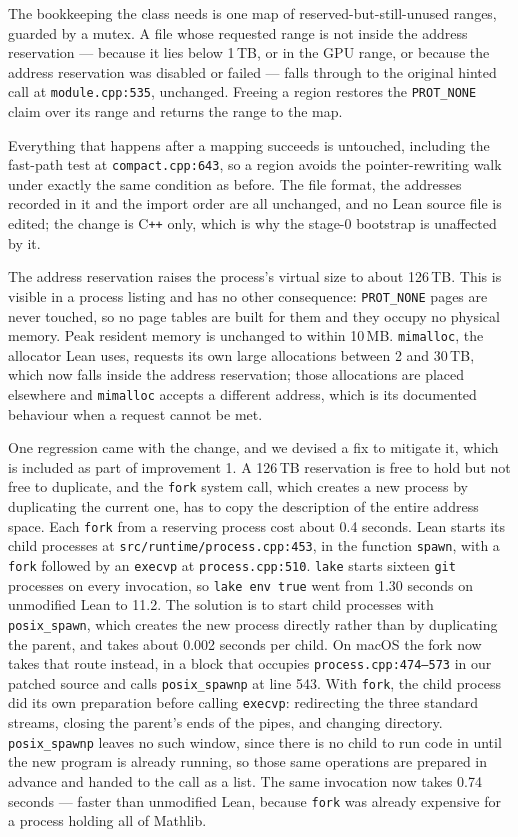 \documentclass{article}
\newcommand{\Lean}{Lean\xspace}      %
\newcommand{\lake}{\texttt{lake}\xspace}      %
\newcommand{\mathlib}{Mathlib\xspace}
\begin{document}
The bookkeeping the class needs is one map of reserved-but-still-unused ranges, guarded by a mutex. A file whose requested range is not inside the address reservation --- because it lies below 1\,TB, or in the GPU range, or because the address reservation was disabled or failed --- falls through to the original hinted call at \texttt{module.cpp:535}, unchanged. Freeing a region restores the \texttt{PROT\_NONE} claim over its range and returns the range to the map.

Everything that happens after a mapping succeeds is untouched, including the fast-path test at \texttt{compact.cpp:643}, so a region avoids the pointer-rewriting walk under exactly the same condition as before. The file format, the addresses recorded in it and the import order are all unchanged, and no \Lean source file is edited; the change is C\texttt{++} only, which is why the stage-0 bootstrap is unaffected by it.

The address reservation raises the process's virtual size to about 126\,TB. This is visible in a process listing and has no other consequence: \texttt{PROT\_NONE} pages are never touched, so no page tables are built for them and they occupy no physical memory. Peak resident memory is unchanged to within 10\,MB. \texttt{mimalloc}, the allocator \Lean uses, requests its own large allocations between 2 and 30\,TB, which now falls inside the address reservation; those allocations are placed elsewhere and \texttt{mimalloc} accepts a different address, which is its documented behaviour when a request cannot be met.

One regression came with the change, and we devised a fix to mitigate it, which is included as part of improvement 1. A 126\,TB reservation is free to hold but not free to duplicate, and the \texttt{fork} system call, which creates a new process by duplicating the current one, has to copy the description of the entire address space. Each \texttt{fork} from a reserving process cost about 0.4 seconds. \Lean starts its child processes at \texttt{src/runtime/process.cpp:453}, in the function \texttt{spawn}, with a \texttt{fork} followed by an \texttt{execvp} at \texttt{process.cpp:510}. \lake starts sixteen \texttt{git} processes on every invocation, so \texttt{lake env true} went from 1.30 seconds on unmodified \Lean to 11.2. The solution is to start child processes with \texttt{posix\_spawn}, which creates the new process directly rather than by duplicating the parent, and takes about 0.002 seconds per child. On macOS the fork now takes that route instead, in a block that occupies \texttt{process.cpp:474--573} in our patched source and calls \texttt{posix\_spawnp} at line 543. With \texttt{fork}, the child process did its own preparation before calling \texttt{execvp}: redirecting the three standard streams, closing the parent's ends of the pipes, and changing directory. \texttt{posix\_spawnp} leaves no such window, since there is no child to run code in until the new program is already running, so those same operations are prepared in advance and handed to the call as a list. The same invocation now takes 0.74 seconds --- faster than unmodified \Lean, because \texttt{fork} was already expensive for a process holding all of \mathlib. 
\end{document}
